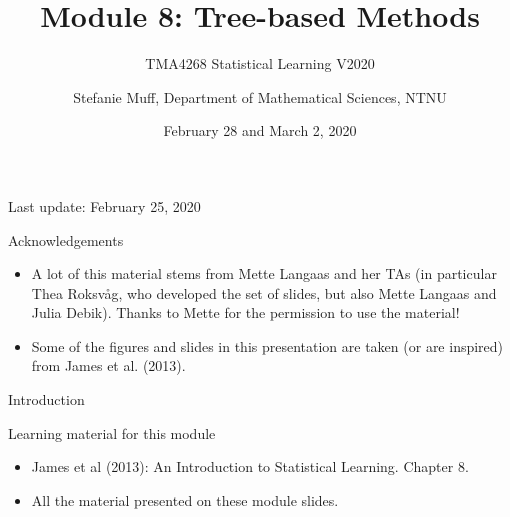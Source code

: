 \documentclass[10pt,ignorenonframetext,]{beamer}
\title{Module 8: Tree-based Methods}
\subtitle{TMA4268 Statistical Learning V2020}
\author{Stefanie Muff, Department of Mathematical Sciences, NTNU}
\date{February 28 and March 2, 2020}
\providecommand{\tightlist}{%
  \setlength{\itemsep}{0pt}\setlength{\parskip}{0pt}}
\begin{document}
\frame{\titlepage}

\begin{frame}

Last update: February 25, 2020

\end{frame}

\begin{frame}{Acknowledgements}

\begin{itemize}
\item
  A lot of this material stems from Mette Langaas and her TAs (in
  particular Thea Roksv\aa g, who developed the set of slides, but also
  Mette Langaas and Julia Debik). Thanks to Mette for the permission to
  use the material!
\item
  Some of the figures and slides in this presentation are taken (or are
  inspired) from James et al. (2013).
\end{itemize}

\end{frame}

\begin{frame}{Introduction}

\begin{block}{Learning material for this module}

\vspace{2mm}

\begin{itemize}
\tightlist
\item
  James et al (2013): An Introduction to Statistical Learning. Chapter
  8.\\
\item
  All the material presented on these module slides.
\end{itemize}

\end{block}

\end{frame}
\end{document}
